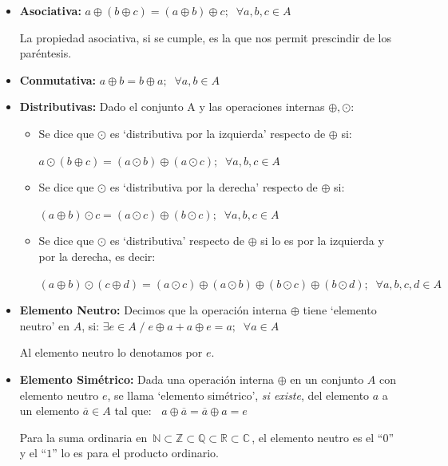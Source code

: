 \begin{itemize}
\item \textbf{Asociativa:} $a \oplus (b \oplus c) =(a \oplus b) \oplus c; \; \; \forall a,b,c \in A$

La propiedad asociativa, si se cumple, es la que nos permit prescindir de los paréntesis.

\item \textbf{Conmutativa:} $a \oplus b = b \oplus a; \; \; \forall a,b \in A$	

\item \textbf{Distributivas:} Dado el conjunto A y las operaciones internas $\oplus, \odot$:
	\begin{itemize}
	 
	\item Se dice que $\odot$ es `distributiva por la izquierda' respecto de $\oplus$ si: 

	$a \odot (b \oplus c) =(a \odot b)\oplus(a \odot c); \; \; \forall a,b,c \in A$

	\item Se dice que $\odot$ es `distributiva por la derecha' respecto de $\oplus$ si: 

	$(a \oplus b) \odot c =(a \odot c)\oplus(b \odot c); \; \; \forall a,b,c \in A$

	\item Se dice que $\odot$ es `distributiva' respecto de $\oplus$ si lo es por la izquierda y por la derecha, es decir:

	$(a\oplus b)\odot(c\oplus d)=(a \odot c) \oplus (a \odot b) \oplus(b \odot c) \oplus(b \odot d); \; \; \forall a,b,c,d \in A $
	\end{itemize}

\item \textbf{Elemento Neutro:} Decimos que la operación interna $\oplus$ tiene `elemento neutro' en $A$, si:
$\exists e \in A \; / \;  e\oplus a + a \oplus e = a; \; \; \forall a \in A$ 

\textcolor{gris}{Al elemento neutro lo denotamos por $e$.}

\item \textbf{Elemento Simétrico:} Dada una operación interna $\oplus$ en un conjunto $A$ con elemento neutro $e$, se llama `elemento simétrico', \textit{si existe}, del elemento $a$ a un elemento $\overline{a} \in A$ tal que:
$\; \; a \oplus \overline{a} = \overline{a} \oplus a =e$

\textcolor{gris}{Para la suma ordinaria en $\, \mathbb N \subset \mathbb Z \subset \mathbb Q \subset \mathbb R \subset \mathbb C\,$, el elemento neutro es el ``$0$'' y el ``$1$'' lo es para el producto ordinario.}


\end{itemize}
